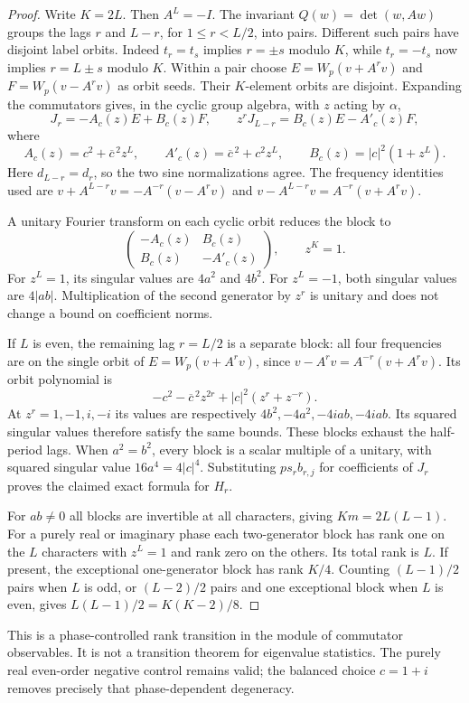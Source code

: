 \begin{proof}
Write $K=2L$. Then $A^L=-I$. The invariant $Q(w)=\det(w,Aw)$ groups
the lags $r$ and $L-r$, for $1\le r<L/2$, into pairs. Different such
pairs have disjoint label orbits. Indeed $t_r=t_s$ implies $r=\pm s$
modulo $K$, while $t_r=-t_s$ now implies $r=L\pm s$ modulo $K$.
Within a pair choose $E=W_p(v+A^rv)$ and $F=W_p(v-A^rv)$ as orbit seeds.
Their $K$-element orbits are disjoint. Expanding the commutators gives, in
the cyclic group algebra, with $z$ acting by $\alpha$,
\[
 J_r=-A_c(z)E+B_c(z)F,\qquad
 z^rJ_{L-r}=B_c(z)E-A'_c(z)F,
\]
where
\[
 A_c(z)=c^2+\overline c^{\,2}z^L,\qquad
 A'_c(z)=\overline c^{\,2}+c^2z^L,\qquad
 B_c(z)=|c|^2(1+z^L).
\]
Here $d_{L-r}=d_r$, so the two sine normalizations agree. The frequency
identities used are
$v+A^{L-r}v=-A^{-r}(v-A^rv)$ and
$v-A^{L-r}v=A^{-r}(v+A^rv)$.

A unitary Fourier transform on each cyclic orbit reduces the block to
\[
 \begin{pmatrix}-A_c(z)&B_c(z)\\ B_c(z)&-A'_c(z)\end{pmatrix},
 \qquad z^K=1.
\]
For $z^L=1$, its singular values are $4a^2$ and $4b^2$.
For $z^L=-1$, both singular values are $4|ab|$.
Multiplication of the second generator by $z^r$ is unitary and does not
change a bound on coefficient norms.

If $L$ is even, the remaining lag $r=L/2$ is a separate block: all four
frequencies are on the single orbit of $E=W_p(v+A^rv)$, since
$v-A^rv=A^{-r}(v+A^rv)$. Its orbit polynomial is
\[
 -c^2-\overline c^{\,2}z^{2r}+|c|^2(z^r+z^{-r}).
\]
At $z^r=1,-1,i,-i$ its values are respectively
$4b^2,-4a^2,-4iab,-4iab$. Its squared singular values therefore satisfy
the same bounds. These blocks exhaust the half-period lags.
When $a^2=b^2$, every block is a scalar multiple of a unitary, with squared
singular value $16a^4=4|c|^4$. Substituting $ps_rb_{r,j}$ for coefficients
of $J_r$ proves the claimed exact formula for $H_r$.

For $ab\ne0$ all blocks are invertible at all characters, giving $Km=2L(L-1)$.
For a purely real or imaginary phase each two-generator block has rank one
on the $L$ characters with $z^L=1$ and rank zero on the others. Its total
rank is $L$. If present, the exceptional one-generator block has rank $K/4$.
Counting $(L-1)/2$ pairs when $L$ is odd, or $(L-2)/2$ pairs and one
exceptional block when $L$ is even, gives $L(L-1)/2=K(K-2)/8$.
\end{proof}
This is a phase-controlled rank transition in the module of commutator
observables. It is not a transition theorem for eigenvalue statistics.
The purely real even-order negative control remains valid; the balanced
choice $c=1+i$ removes precisely that phase-dependent degeneracy.
